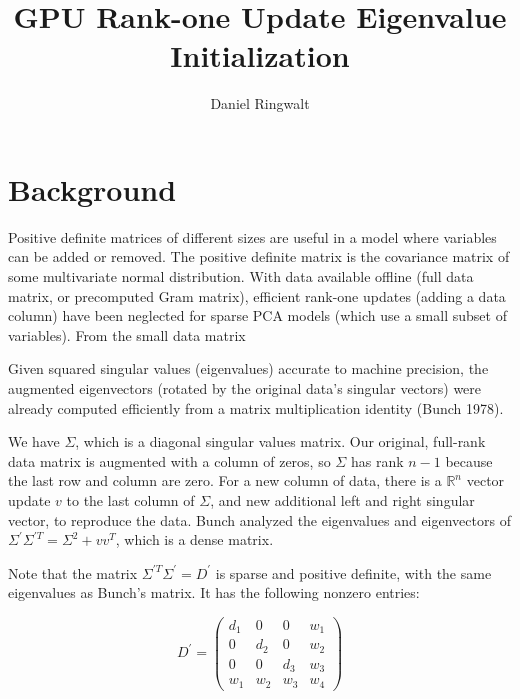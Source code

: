 \documentclass{article}
\title{GPU Rank-one Update Eigenvalue Initialization}
\author{Daniel Ringwalt}
\begin{document}
	
\maketitle

\section{Background}

Positive definite matrices of different sizes are useful in a model where variables can be added or removed. The positive definite matrix is the covariance matrix of some multivariate normal distribution. With data available offline (full data matrix, or precomputed Gram matrix), efficient rank-one updates (adding a data column) have been neglected for sparse PCA models (which use a small subset of variables). From the small data matrix 

Given squared singular values (eigenvalues) accurate to machine precision, the augmented eigenvectors (rotated by the original data's singular vectors) were already computed efficiently from a matrix multiplication identity (Bunch 1978).

We have $\Sigma$, which is a diagonal singular values matrix. Our original, full-rank data matrix is augmented with a column of zeros, so $\Sigma$ has rank $n-1$ because the last row and column are zero. For a new column of data, there is a $\mathbb{R}^n$ vector update $v$ to the last column of $\Sigma$, and new additional left and right singular vector, to reproduce the data. Bunch analyzed the eigenvalues and eigenvectors of $\Sigma^\prime \Sigma^{\prime T} = \Sigma^2 + v v^T$, which is a dense matrix.

Note that the matrix $\Sigma^{\prime T} \Sigma^\prime = D^\prime$ is sparse and positive definite, with the same eigenvalues as Bunch's matrix. It has the following nonzero entries:

$$
D^\prime =
\left(\begin{matrix}
d_1 & 0 & 0 & w_1 \\
0 & d_2 & 0 & w_2 \\
0 & 0 & d_3 & w_3 \\
w_1 & w_2 & w_3 & w_4
\end{matrix}\right)
$$
\end{document}
